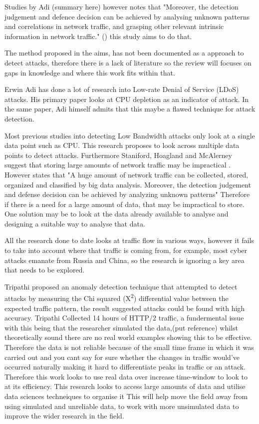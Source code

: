  Studies by Adi (summary here) however \citeauthor{9016229} notes that "Moreover, the detection judgement and defence decision can be achieved by analysing unknown patterns and correlations in network traffic, and grasping other relevant intrinsic information in network traffic."  (\cite{9016229}) this study aims to do that.


The method proposed in the aims, has not been documented as a approach to detect attacks, therefore there is a lack of literature so the review will focuses on gaps in knowledge and where this work fits within that.


Erwin Adi has done a lot of research into Low-rate Denial of Service (LDoS) attacks. His primary paper looks at CPU depletion as an indicator of attack. In the same paper, Adi himself admits that this maybe a flawed technique for attack detection. \cite{Adi2016} 

Most previous studies into detecting Low Bandwidth attacks only look at a single data point such as CPU. This research proposes to look across multiple data points to detect attacks. Furthermore Staniford, Hoagland and McAlerney suggest that storing large amounts of network traffic may be impractical \cite{staniford2002practical}. However \citeauthor{9016229} states that "A huge amount of network traffic can be collected, stored, organized and classified by big data analysis. Moreover, the detection judgement and defense decision can be achieved by analyzing unknown patterns" \cite{9016229} Therefore if there is a need for a large amount of data, that may be impractical to store. One solution may be to look at the data already available to analyse and designing a suitable way to analyse that data.

All the research done to date looks at traffic flow in various ways, however it fails to take into account where that traffic is coming from, for example, most cyber attacks emanate from Russia and China, so the research is ignoring a key area that needs to be explored.

Tripathi proposed an anomaly detection technique that attempted to detect attacks by measuring the Chi squared (X\textsuperscript{\small2}) differential value between the expected traffic pattern, the result suggested attacks could be found with high accuracy. Tripathi Collected 14 hours of HTTP/2 traffic, a fundermental issue with this being that the researcher simulated the data,(put reference) whilst theoretically sound there are no real world examples showing this to be effective. Therefore the data is not reliable because of the small time frame in which it was carried out and you cant say for sure whether the changes in traffic would've occurred naturally making it hard to differentiate peaks in traffic or an attack. Therefore this work looks to use real data over increase time-window to look to at its efficiency. This research looks to access large amounts of data and utilise data sciences techneiques to organise it This will help move the field away from using simulated and unreliable data, to work with more unsimulated data to improve the wider research in the field. 

